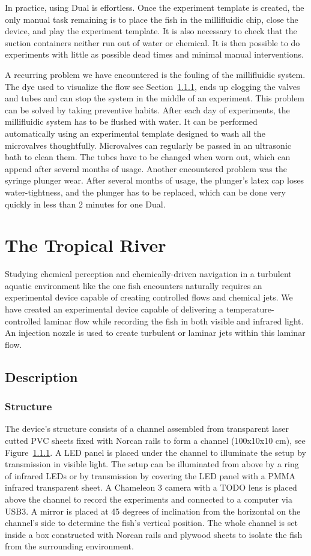  In practice, using Dual is effortless. Once the experiment template is created, the only manual task remaining is to place the fish in the millifluidic chip, close the device, and play the experiment template. It is also necessary to check that the suction containers neither run out of water or chemical. It is then possible to do experiments with little as possible dead times and minimal manual interventions.

  A recurring problem we have encountered is the fouling of the millifluidic system. The dye used to visualize the flow see Section~\ref{}, ends up clogging the valves and tubes and can stop the system in the middle of an experiment. This problem can be solved by taking preventive habits. After each day of experiments, the millifluidic system has to be flushed with water. It can be performed automatically using an experimental template designed to wash all the microvalves thoughtfully. Microvalves can regularly be passed in an ultrasonic bath to clean them. The tubes have to be changed when worn out, which can append after several months of usage. Another encountered problem was the syringe plunger wear. After several months of usage, the plunger's latex cap loses water-tightness, and the plunger has to be replaced, which can be done very quickly in less than 2 minutes for one Dual.


    \section{The Tropical River}
  Studying chemical perception and chemically-driven navigation in a turbulent aquatic environment like the one fish encounters naturally requires an experimental device capable of creating controlled flows and chemical jets. We have created an experimental device capable of delivering a temperature-controlled laminar flow while recording the fish in both visible and infrared light. An injection nozzle is used to create turbulent or laminar jets within this laminar flow.

\subsection{Description}
  \subsubsection{Structure}
  The device's structure consists of a channel assembled from transparent laser cutted PVC sheets fixed with Norcan rails to form a channel (100x10x10 cm), see Figure~\ref{}. A LED panel is placed under the channel to illuminate the setup by transmission in visible light. The setup can be illuminated from above by a ring of infrared LEDs or by transmission by covering the LED panel with a PMMA infrared transparent sheet. A Chameleon 3 camera with a TODO lens is placed above the channel to record the experiments and connected to a computer via USB3. A mirror is placed at 45 degrees of inclination from the horizontal on the channel's side to determine the fish's vertical position. The whole channel is set inside a box constructed with Norcan rails and plywood sheets to isolate the fish from the surrounding environment.

